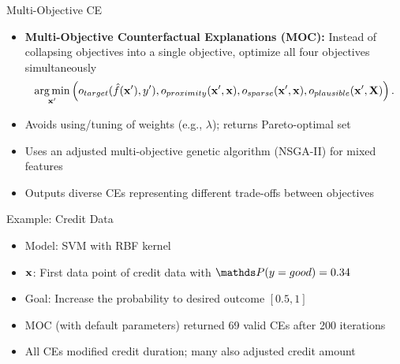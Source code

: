\documentclass[10pt,compress,t,notes=noshow, xcolor=table]{beamer}
\begin{document}
\begin{frame}{Multi-Objective CE }
	\begin{itemize}
		\item \textbf{Multi-Objective Counterfactual Explanations (MOC):} Instead of collapsing objectives into a single objective, optimize all four objectives simultaneously
	$$	\mathop{\mathrm{arg\,min}}_{\mathbf{x}'} \left(o_{target}(\hat{f}(\mathbf{x}'), y'), o_{proximity}(\mathbf{x}', \mathbf{x}), o_{sparse}(\mathbf{x}', \mathbf{x}), o_{plausible}(\mathbf{x}', \mathbf{X}) \right). $$
		
		\item Avoids using/tuning of weights (e.g., \(\lambda\)); returns Pareto-optimal set
		\item Uses an adjusted multi-objective genetic algorithm (NSGA-II) for mixed features %
		\item Outputs diverse CEs representing different trade-offs between objectives
	\end{itemize}

\end{frame}

\begin{frame}{Example: Credit Data}
	\begin{itemize}
		\item Model: SVM with RBF kernel
		\item $\mathbf{x}$: First data point of credit data with $\P(y = good)  = 0.34$ %
		\item Goal: Increase the probability to desired outcome $[0.5, 1]$
		\item MOC (with default parameters) returned 69 valid CEs after 200 iterations%
		\item All CEs modified credit duration; many also adjusted credit amount
	\end{itemize}
\end{frame}
\end{document}
